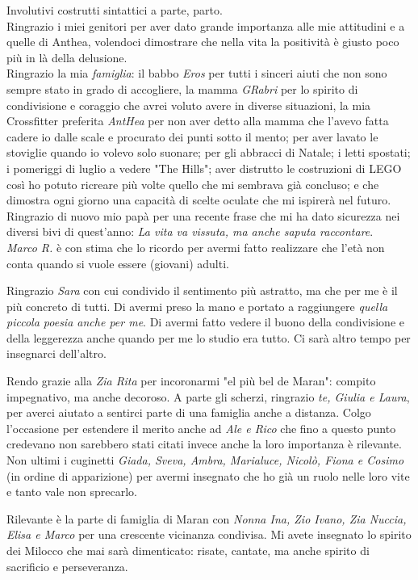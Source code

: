 \documentclass[a4paper,10pt, oneside]{book} %
\theoremstyle{definition}
\begin{document}
Involutivi costrutti sintattici a parte, parto.\\
Ringrazio i miei genitori per aver dato grande importanza alle mie attitudini e a quelle di Anthea, volendoci dimostrare che nella vita la positività è giusto poco più in là della delusione.
\\Ringrazio la mia \textit{famiglia}: il babbo \textit{Eros} per tutti i sinceri aiuti che non sono sempre stato in grado di accogliere, la mamma \textit{GRabri} per lo spirito di condivisione e coraggio che avrei voluto avere in diverse situazioni, la mia Crossfitter preferita \textit{AntHea} per non aver detto alla mamma che l'avevo fatta cadere io dalle scale e procurato dei punti sotto il mento; per aver lavato le stoviglie quando io volevo solo suonare; per gli abbracci di Natale; i letti spostati; i pomeriggi di luglio a vedere "The Hills"; aver distrutto le costruzioni di LEGO così ho potuto ricreare più volte quello che mi sembrava già concluso; e che dimostra ogni giorno una capacità di scelte oculate che mi ispirerà nel futuro. Ringrazio di nuovo mio papà per una recente frase che mi ha dato sicurezza nei diversi bivi di quest'anno: \textit{La vita va vissuta, ma anche saputa raccontare}.\\
\textit{Marco R.} è con stima che lo ricordo per avermi fatto realizzare che l'età non conta quando si vuole essere (giovani) adulti.

Ringrazio \textit{Sara} con cui condivido il sentimento più astratto, ma che per me è il più concreto di tutti. Di avermi preso la mano e portato a raggiungere \textit{quella piccola poesia anche per me}.
Di avermi fatto vedere il buono della condivisione e della leggerezza anche quando per me lo studio era tutto. Ci sarà altro tempo per insegnarci dell'altro.

Rendo grazie alla \textit{Zia Rita} per incoronarmi "el più bel de Maran": compito impegnativo, ma anche decoroso. A parte gli scherzi, ringrazio \textit{te, Giulia e Laura}, per averci aiutato a sentirci parte di una famiglia anche a distanza. Colgo l'occasione per estendere il merito anche ad \textit{Ale e Rico} che fino a questo punto credevano non sarebbero stati citati invece anche la loro importanza è rilevante. Non ultimi i cuginetti \textit{Giada, Sveva, Ambra, Marialuce, Nicolò, Fiona e Cosimo} (in ordine di apparizione) per avermi insegnato che ho già un ruolo nelle loro vite e tanto vale non sprecarlo.

Rilevante è la parte di famiglia di Maran con \textit{Nonna Ina, Zio Ivano, Zia Nuccia, Elisa e Marco} per una crescente vicinanza condivisa. Mi avete insegnato lo spirito dei Milocco che mai sarà dimenticato: risate, cantate, ma anche spirito di sacrificio e perseveranza.
\end{document}
